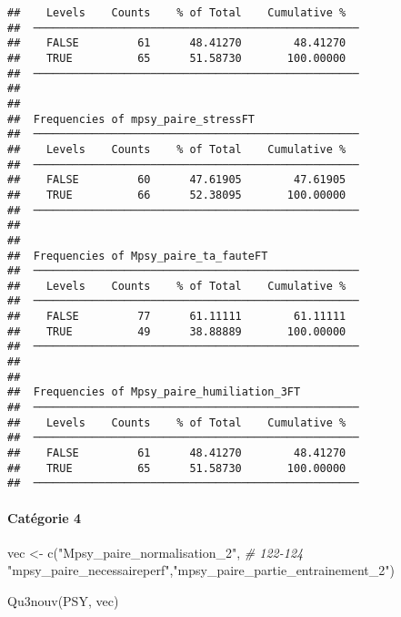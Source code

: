\documentclass[
]{article}
\newenvironment{Shaded}{\begin{snugshade}}{\end{snugshade}}
\newcommand{\CommentTok}[1]{\textcolor[rgb]{0.56,0.35,0.01}{\textit{#1}}}
\newcommand{\FunctionTok}[1]{\textcolor[rgb]{0.00,0.00,0.00}{#1}}
\newcommand{\NormalTok}[1]{#1}
\newcommand{\OtherTok}[1]{\textcolor[rgb]{0.56,0.35,0.01}{#1}}
\newcommand{\StringTok}[1]{\textcolor[rgb]{0.31,0.60,0.02}{#1}}
\begin{document}
\begin{verbatim}
##    Levels    Counts    % of Total    Cumulative %   
##  ────────────────────────────────────────────────── 
##    FALSE         61      48.41270        48.41270   
##    TRUE          65      51.58730       100.00000   
##  ────────────────────────────────────────────────── 
## 
## 
##  Frequencies of mpsy_paire_stressFT                 
##  ────────────────────────────────────────────────── 
##    Levels    Counts    % of Total    Cumulative %   
##  ────────────────────────────────────────────────── 
##    FALSE         60      47.61905        47.61905   
##    TRUE          66      52.38095       100.00000   
##  ────────────────────────────────────────────────── 
## 
## 
##  Frequencies of Mpsy_paire_ta_fauteFT               
##  ────────────────────────────────────────────────── 
##    Levels    Counts    % of Total    Cumulative %   
##  ────────────────────────────────────────────────── 
##    FALSE         77      61.11111        61.11111   
##    TRUE          49      38.88889       100.00000   
##  ────────────────────────────────────────────────── 
## 
## 
##  Frequencies of Mpsy_paire_humiliation_3FT          
##  ────────────────────────────────────────────────── 
##    Levels    Counts    % of Total    Cumulative %   
##  ────────────────────────────────────────────────── 
##    FALSE         61      48.41270        48.41270   
##    TRUE          65      51.58730       100.00000   
##  ──────────────────────────────────────────────────
\end{verbatim}

\hypertarget{catuxe9gorie-4}{%
\paragraph{Catégorie 4}\label{catuxe9gorie-4}}

\begin{Shaded}
\begin{Highlighting}[]
\NormalTok{vec }\OtherTok{\textless{}{-}} \FunctionTok{c}\NormalTok{(}\StringTok{"Mpsy\_paire\_normalisation\_2"}\NormalTok{,  }\CommentTok{\# 122{-}124}
         \StringTok{"mpsy\_paire\_necessaireperf"}\NormalTok{,}\StringTok{"mpsy\_paire\_partie\_entrainement\_2"}\NormalTok{) }

\FunctionTok{Qu3nouv}\NormalTok{(PSY, vec)}
\end{Highlighting}
\end{Shaded}
\end{document}
